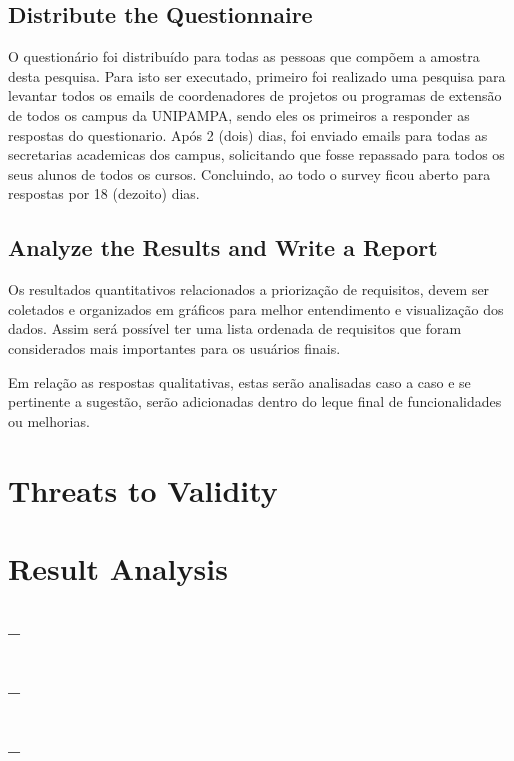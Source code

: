 \subsection{Distribute the Questionnaire}\label{sec:survey-distribute}

O questionário foi distribuído para todas as pessoas que compõem a amostra desta pesquisa. 
Para isto ser executado, primeiro foi realizado uma pesquisa para levantar todos os emails de coordenadores de projetos ou programas de extensão de todos os campus da \ac{UNIPAMPA}, sendo eles os primeiros a responder as respostas do questionario. 
Após 2 (dois) dias, foi enviado emails para todas as secretarias academicas dos campus, solicitando que fosse repassado para todos os seus alunos de todos os cursos. 
Concluindo, ao todo o survey ficou aberto para respostas por 18 (dezoito) dias.

\subsection{Analyze the Results and Write a Report}\label{sec:survey-analyse}

Os resultados quantitativos relacionados a priorização de requisitos, devem ser coletados e organizados em gráficos para melhor entendimento e visualização dos dados. 
Assim será possível ter uma lista ordenada de requisitos que foram considerados mais importantes para os usuários finais.

Em relação as respostas qualitativas, estas serão analisadas caso a caso e se pertinente a sugestão, serão adicionadas dentro do leque final de funcionalidades ou melhorias.

\section{Threats to Validity}\label{sec:survey-threats}


\section{Result Analysis}\label{sec:survey-results}

\subsection{--} %

\subsection{--} %

\subsection{--} %